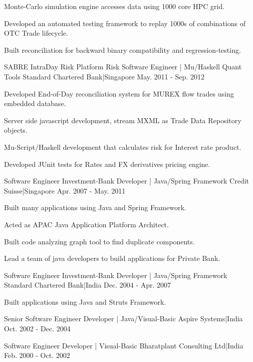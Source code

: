 \begin{cventries}
{\begin{cvitems}
        \item {Monte-Carlo simulation engine accesses data using 1000 core HPC grid.}
        \item {Developed an automated testing framework to replay 1000s of combinations of OTC Trade lifecycle.}
        \item {Built reconciliation for backward binary compatibility and regression-testing.}
      \end{cvitems}
    }
  \cventry
    {SABRE IntraDay Risk Platform}
    {Risk Software Engineer | Mu/Haskell Quant Tools}
    {Standard Chartered Bank|Singapore}
    {May. 2011 - Sep. 2012}
    {
      \begin{cvitems}
        \item {Developed End-of-Day reconciliation system for MUREX flow trades using embedded database.}
        \item {Server side javascript development, stream MXML as Trade Data Repository objects.}
        \item {Mu-Script/Haskell development that calculates risk for Interest rate product.}
        \item {Developed JUnit tests for Rates and FX derivatives pricing engine.}
      \end{cvitems}
    }
  \cventry
    {Software Engineer}
    {Investment-Bank Developer | Java/Spring Framework}
    {Credit Suisse|Singapore}
    {Apr. 2007 - May. 2011}
    {
      \begin{cvitems}
        \item {Built many applications using Java and Spring Framework.}
        \item {Acted as APAC Java Application Platform Architect.}
        \item {Built code analyzing graph tool to find duplicate components.}
        \item {Lead a team of java developers to build applications for Private Bank.}
      \end{cvitems}
    }
  \cventry
    {Software Engineer}
    {Investment-Bank Developer | Java/Spring Framework}
    {Standard Chartered Bank|India}
    {Dec. 2004 - Apr. 2007}
    {
      \begin{cvitems}
        \item {Built applications using Java and Struts Framework.}
      \end{cvitems}
    }
  \cventry
    {Senior Software Engineer}
    {Developer | Java/Visual-Basic}
    {Aspire Systems|India}
    {Oct. 2002 - Dec. 2004}
    {
      \begin{cvitems}
      \end{cvitems}
    }
  \cventry
    {Software Engineer}
    {Developer | Visual-Basic}
    {Bharatplant Consulting Ltd|India}
    {Feb. 2000 - Oct. 2002}
    {
      \begin{cvitems}
      \end{cvitems}
    }
\end{cventries}
